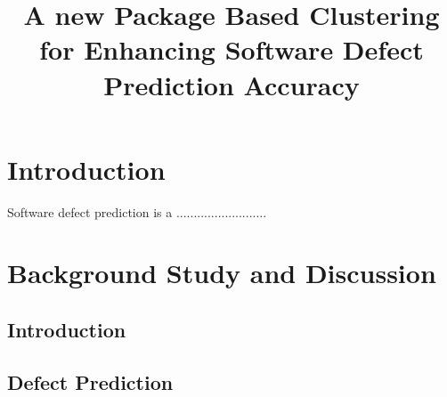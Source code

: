\documentclass[12pt]{report}
\begin{document}
\doublespacing

\title{ A new Package Based Clustering for Enhancing Software Defect Prediction Accuracy}
\date{}
\maketitle
%
%
%
%
%
%
%
\chapter{Introduction}
Software defect prediction is a ..........................
\chapter{Background Study and Discussion}
\section{Introduction}
\section{Defect Prediction}
\end{document}
